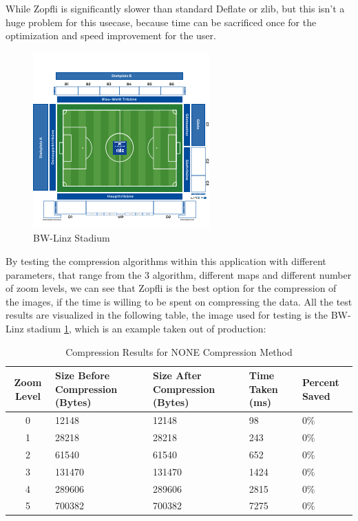 While Zopfli is significantly slower than standard Deflate or zlib, but this isn't a huge problem for this usecase, because time can be sacrificed once for the optimization and speed improvement for the user.

\begin{figure}
    \centering
    \includegraphics[scale=0.8]{pics/test_stadium.png}
    \caption{BW-Linz Stadium}
    \label{fig:impl:bw-stadium}
\end{figure}

By testing the compression algorithms within this application with different parameters, that range from the 3 algorithm, different maps and different number of zoom levels, we can see that Zopfli is the best option for the compression of the images, if the time is willing to be spent on compressing the data. All the test results are visualized in the following table, the image used for testing is the BW-Linz stadium \ref{fig:impl:bw-stadium}, which is an example taken out of production:


\begin{table}[h]
    \centering
    \begin{tabularx}{\textwidth}{|c|X|X|X|X|}
        \hline
        \textbf{Zoom Level} & \textbf{Size Before Compression (Bytes)} & \textbf{Size After Compression (Bytes)} & \textbf{Time Taken (ms)} & \textbf{Percent Saved} \\ \hline
        0 & 12148 & 12148 & 98 & 0\% \\ \hline
        1 & 28218 & 28218 & 243 & 0\% \\ \hline
        2 & 61540 & 61540 & 652 & 0\% \\ \hline
        3 & 131470 & 131470 & 1424 & 0\% \\ \hline
        4 & 289606 & 289606 & 2815 & 0\% \\ \hline
        5 & 700382 & 700382 & 7275 & 0\% \\ \hline
    \end{tabularx}
    \caption{Compression Results for NONE Compression Method}
    \label{tab:compression_none}
\end{table}

